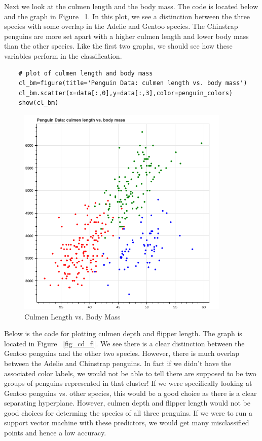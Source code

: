 \documentclass[12pt]{article}
\begin{document}
Next we look at the culmen length and the body mass. The code is located below and the graph in Figure ~\ref{fig_cl_bm}. In this plot, we see a distinction between the three species with some overlap in the Adelie and Gentoo species. The Chinstrap penguins are more set apart with a higher culmen length and lower body mass than the other species. Like the first two graphs, we should see how these variables perform in the classification.

\begin{verbatim}
    # plot of culmen length and body mass
    cl_bm=figure(title='Penguin Data: culmen length vs. body mass')
    cl_bm.scatter(x=data[:,0],y=data[:,3],color=penguin_colors)
    show(cl_bm)
\end{verbatim}

\begin{figure}[H]
    \centering
    \includegraphics[width=4in]{Figures/penguins/cl_bm.png}
    \caption{Culmen Length vs. Body Mass}
    \label{fig_cl_bm}
\end{figure}

Below is the code for plotting culmen depth and flipper length. The graph is located in Figure ~\ref{fig_cd_fl}. We see there is a clear distinction between the Gentoo penguins and the other two species. However, there is much overlap between the Adelie and Chinstrap penguins. In fact if we didn't have the associated color labels, we would not be able to tell there are supposed to be two groups of penguins represented in that cluster! If we were specifically looking at Gentoo penguins vs. other species, this would be a good choice as there is a clear separating hyperplane. However, culmen depth and flipper length would not be good choices for determing the species of all three penguins. If we were to run a support vector machine with these predictors, we would get many misclassified points and hence a low accuracy.
\end{document}

